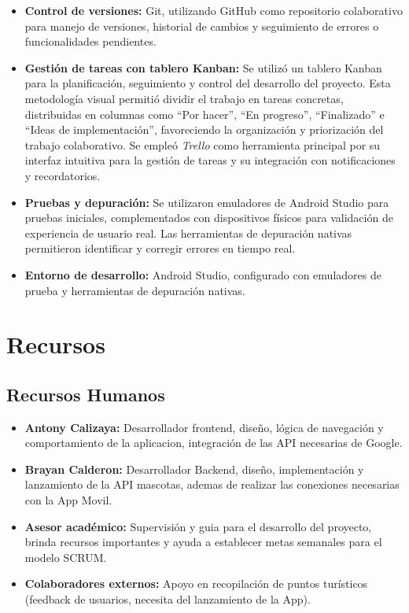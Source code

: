 \documentclass[12pt]{article}
\begin{document}
\begin{itemize}
    \item \textbf{Control de versiones:} Git, utilizando GitHub como repositorio colaborativo para manejo de versiones, historial de cambios y seguimiento de errores o funcionalidades pendientes.
    
    \item \textbf{Gestión de tareas con tablero Kanban:} Se utilizó un tablero Kanban para la planificación, seguimiento y control del desarrollo del proyecto. Esta metodología visual permitió dividir el trabajo en tareas concretas, distribuidas en columnas como “Por hacer”, “En progreso”, “Finalizado” e “Ideas de implementación”, favoreciendo la organización y priorización del trabajo colaborativo. Se empleó \textit{Trello} como herramienta principal por su interfaz intuitiva para la gestión de tareas y su integración con notificaciones y recordatorios.
    
    \item \textbf{Pruebas y depuración:} Se utilizaron emuladores de Android Studio para pruebas iniciales, complementados con dispositivos físicos para validación de experiencia de usuario real. Las herramientas de depuración nativas permitieron identificar y corregir errores en tiempo real.
    
    \item \textbf{Entorno de desarrollo:} Android Studio, configurado con emuladores de prueba y herramientas de depuración nativas.
\end{itemize}

\section{Recursos}

\subsection{Recursos Humanos}
\begin{itemize}
    \item \textbf{Antony Calizaya:} Desarrollador frontend, diseño, lógica de navegación y comportamiento de la aplicacion, integración de las API necesarias de Google.
    \item \textbf{Brayan Calderon:} Desarrollador Backend, diseño, implementación y lanzamiento de la API mascotas, ademas de realizar las conexiones necesarias con la App Movil.
    \item \textbf{Asesor académico:} Supervisión y guia para el desarrollo del proyecto, brinda recursos importantes y ayuda a establecer metas semanales para el modelo SCRUM.
    \item \textbf{Colaboradores externos:} Apoyo en recopilación de puntos turísticos (feedback de usuarios, necesita del lanzamiento de la App).
\end{itemize}
\end{document}

